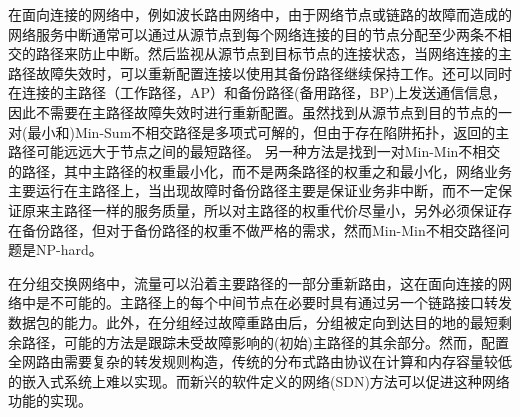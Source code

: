 在面向连接的网络中，例如波长路由网络中，由于网络节点或链路的故障而造成的网络服务中断通常可以通过从源节点到每个网络连接的目的节点分配至少两条不相交的路径来防止中断\cite{kuipers2012overview}。然后监视从源节点到目标节点的连接状态，当网络连接的主路径故障失效时，可以重新配置连接以使用其备份路径继续保持工作。还可以同时在连接的主路径（工作路径，AP）和备份路径(备用路径，BP)上发送通信信息，因此不需要在主路径故障失效时进行重新配置。虽然找到从源节点到目的节点的一对(最小和)Min-Sum不相交路径是多项式可解的\cite{suurballe1974disjoint,suurballe1984quick}，但由于存在陷阱拓扑\cite{dunn1994comparison}，返回的主路径可能远远大于节点之间的最短路径\cite{dunn1994comparison}。 另一种方法是找到一对Min-Min不相交的路径，其中主路径的权重最小化，而不是两条路径的权重之和最小化，网络业务主要运行在主路径上，当出现故障时备份路径主要是保证业务非中断，而不一定保证原来主路径一样的服务质量，所以对主路径的权重代价尽量小，另外必须保证存在备份路径，但对于备份路径的权重不做严格的需求，然而Min-Min不相交路径问题是NP-hard\cite{guo2013finding}。%




在分组交换网络中，流量可以沿着主要路径的一部分重新路由，这在面向连接的网络中是不可能的。主路径上的每个中间节点在必要时具有通过另一个链路接口转发数据包的能力。此外，在分组经过故障重路由后，分组被定向到达目的地的最短剩余路径，可能的方法是跟踪未受故障影响的(初始)主路径的其余部分。然而，配置全网路由需要复杂的转发规则构造，传统的分布式路由协议在计算和内存容量较低的嵌入式系统上难以实现。而新兴的软件定义的网络(SDN)方法可以促进这种网络功能的实现。






